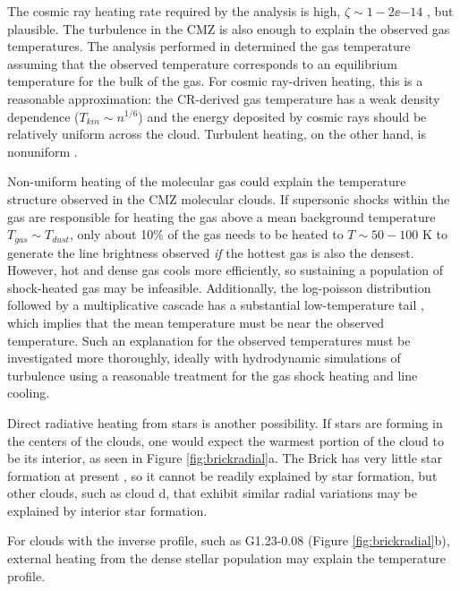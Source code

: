 The cosmic ray heating rate required by the \citet{Ao2013a} analysis is high,
$\zeta\sim1-2\ee{-14}$ \pers, but plausible.  The turbulence in the CMZ is also
enough to explain the observed gas temperatures. 
The analysis performed in \citet{Ao2013a} determined the gas temperature
assuming that the observed temperature corresponds to an equilibrium temperature
for the bulk of the gas.  For
cosmic ray-driven heating, this is a reasonable approximation: the CR-derived
gas temperature
has a weak density dependence ($T_{kin}\sim n^{1/6}$) and the energy deposited
by cosmic rays should be relatively uniform across the cloud.  Turbulent heating,
on the other hand, is nonuniform \citep{Pan2009a}.

Non-uniform heating of the molecular gas could explain the temperature
structure observed in the CMZ molecular clouds.  If supersonic shocks within
the gas are responsible for heating the gas above a mean background temperature
$T_{gas} \sim T_{dust}$, only about 10\% of the gas needs to be heated to
$T\sim50-100$ K to generate the line brightness observed \emph{if} the hottest
gas is also the densest.  However, hot and dense gas cools more efficiently, so
sustaining a population of shock-heated gas may be infeasible.  Additionally,
the log-poisson distribution followed by a multiplicative cascade has a
substantial low-temperature tail \citep{Pan2009a}, which implies that the mean
temperature must be near the observed temperature.  Such an explanation for the
observed temperatures must be investigated more thoroughly, ideally with
hydrodynamic simulations of turbulence using a reasonable treatment for the gas
shock heating and line cooling.

Direct radiative heating from stars is another possibility.  If stars are
forming in the centers of the clouds, one would expect the warmest portion of
the cloud to be its interior, as seen in Figure \ref{fig:brickradial}a.  The
Brick has very little star formation at present \citep{Rathborne2014b}, so it
cannot be readily explained by star formation, but other clouds, such as cloud
d, that exhibit similar radial variations may be explained by interior star
formation.

For clouds with the inverse profile, such as G1.23-0.08 (Figure
\ref{fig:brickradial}b), external heating from the dense stellar population may
explain the temperature profile.  

